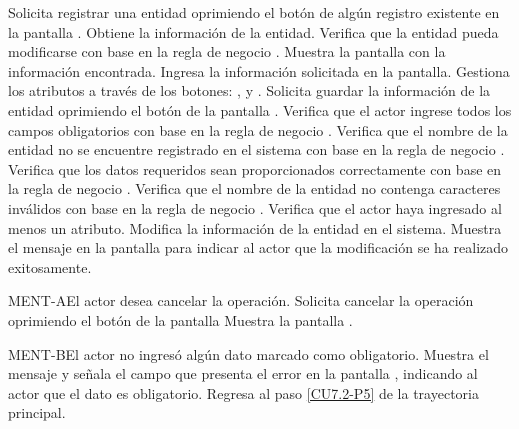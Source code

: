 	\begin{UCtrayectoria}
		\UCpaso[\UCactor] Solicita registrar una entidad oprimiendo el botón \editar de algún registro existente en la pantalla .
		\UCpaso[\UCsist] Obtiene la información de la entidad.
		\UCpaso[\UCsist] Verifica que la entidad pueda modificarse con base en la regla de negocio . 
		\UCpaso[\UCsist] Muestra la pantalla  con la información encontrada.
		\UCpaso[\UCactor] Ingresa la información solicitada en la pantalla. \label{CU7.2-P5}
		\UCpaso[\UCactor] Gestiona los atributos a través de los botones: , \editar y \eliminar. \label{CU7.2-P6}
		\UCpaso[\UCactor] Solicita guardar la información de la entidad oprimiendo el botón  de la pantalla . 
		\UCpaso[\UCsist] Verifica que el actor ingrese todos los campos obligatorios con base en la regla de negocio . 
		\UCpaso[\UCsist] Verifica que el nombre de la entidad no se encuentre registrado en el sistema con base en la regla de negocio . 
		\UCpaso[\UCsist] Verifica que los datos requeridos sean proporcionados correctamente con base en la regla de negocio .  
		\UCpaso[\UCsist] Verifica que el nombre de la entidad no contenga caracteres inválidos con base en la regla de negocio . 
		\UCpaso[\UCsist] Verifica que el actor haya ingresado al menos un atributo. 
		\UCpaso[\UCsist] Modifica la información de la entidad en el sistema.
		\UCpaso[\UCsist] Muestra el mensaje  en la pantalla  para indicar al actor que la modificación se ha realizado exitosamente.
	\end{UCtrayectoria}		
	
	\begin{UCtrayectoriaA}{MENT-A}{El actor desea cancelar la operación.}
		\UCpaso[\UCactor] Solicita cancelar la operación oprimiendo el botón  de la pantalla 
		\UCpaso[\UCsist] Muestra la pantalla .
	\end{UCtrayectoriaA}

	\begin{UCtrayectoriaA}{MENT-B}{El actor no ingresó algún dato marcado como obligatorio.}
		\UCpaso[\UCsist] Muestra el mensaje  y señala el campo que presenta el error en la pantalla , indicando al actor que el dato es obligatorio.
		\UCpaso Regresa al paso \ref{CU7.2-P5} de la trayectoria principal.
	\end{UCtrayectoriaA}
	
